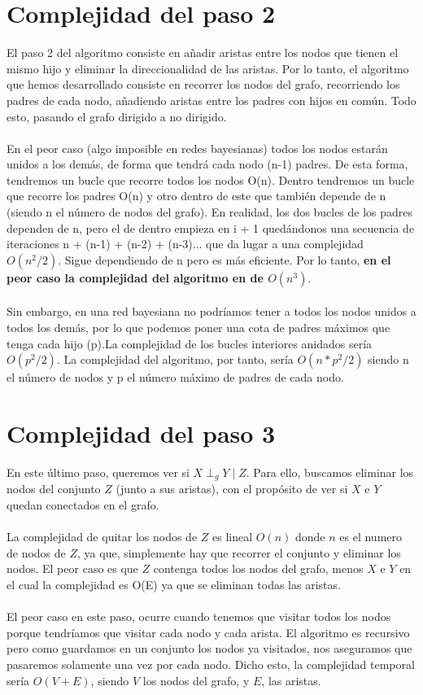 \documentclass[a4paper,12pt]{article}
\begin{document}
\section{Complejidad del paso 2}
El paso 2 del algoritmo consiste en añadir aristas entre los nodos que tienen el mismo hijo y eliminar la direccionalidad de las aristas. Por lo tanto, el algoritmo que hemos desarrollado consiste en recorrer los nodos del grafo, recorriendo los padres de cada nodo, añadiendo aristas entre los padres con hijos en común. Todo esto, pasando el grafo dirigido a no dirigido. \\ \\
En el peor caso (algo imposible en redes bayesianas) todos los nodos estarán unidos a los demás, de forma que tendrá cada nodo (n-1) padres. De esta forma, tendremos un bucle que recorre todos los nodos O(n). Dentro tendremos un bucle que recorre los padres O(n) y otro dentro de este que también depende de n (siendo n el número de nodos del grafo). En realidad, los dos bucles de los padres dependen de n, pero el de dentro empieza en i + 1 quedándonos una secuencia de iteraciones n + (n-1) + (n-2) + (n-3)... que da lugar a una complejidad $O(n^2/2)$. Sigue dependiendo de n pero es más eficiente. Por lo tanto, \textbf{en el peor caso la complejidad del algoritmo en de $O(n^3)$}. \\ \\ 
Sin embargo, en una red bayesiana no podríamos tener a todos los nodos unidos a todos los demás, por lo que podemos poner una cota de padres máximos que tenga cada hijo (p).La complejidad de los bucles interiores anidados sería $O(p^2/2)$. La complejidad del algoritmo, por tanto, sería $O(n * p^2/2)$ siendo n el número de nodos y p el número máximo de padres de cada nodo.
 
\section{Complejidad del paso 3}
En este último paso, queremos ver si  $X \perp _g Y \mid Z$. Para ello, buscamos eliminar los nodos del conjunto $Z$ (junto a sus aristas), con el propósito de ver si $X$ e $Y$ quedan conectados en el grafo. \\ \\
La complejidad de quitar los nodos de $Z$ es lineal $O(n)$ donde $n$ es el numero de nodos de $Z$, ya que, simplemente hay que recorrer el conjunto y eliminar los nodos. El peor caso es que $Z$ contenga todos los nodos del grafo, menos $X$ e $Y$ en el cual la complejidad es O(E) ya que se eliminan todas las aristas. \\ \\
El peor caso en este paso, ocurre cuando tenemos que visitar todos los nodos porque tendríamos que visitar cada nodo y cada arista. El algoritmo es recursivo pero como guardamos en un conjunto los nodos ya visitados, nos aseguramos que pasaremos solamente una vez por cada nodo. Dicho esto, la complejidad temporal sería  $O(V + E)$, siendo $V$ los nodos del grafo, y $E$, las aristas.
\end{document}
